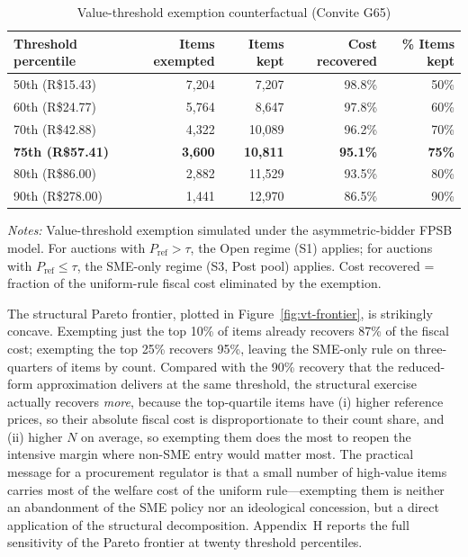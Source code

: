 \documentclass[12pt]{article}
\begin{document}
\begin{table}[htbp]
\centering
\caption{Value-threshold exemption counterfactual (Convite G65)}
\label{tab:cf}
\begin{threeparttable}
\small
\begin{tabular}{lrrrr}
\toprule
Threshold percentile & Items exempted & Items kept & Cost recovered &
\% Items kept \\
\midrule
50th (R\$15.43)  &  7{,}204 &  7{,}207 & 98.8\% & 50\% \\
60th (R\$24.77)  &  5{,}764 &  8{,}647 & 97.8\% & 60\% \\
70th (R\$42.88)  &  4{,}322 & 10{,}089 & 96.2\% & 70\% \\
\textbf{75th (R\$57.41)} & \textbf{3{,}600} & \textbf{10{,}811} &
\textbf{95.1\%} & \textbf{75\%} \\
80th (R\$86.00)  &  2{,}882 & 11{,}529 & 93.5\% & 80\% \\
90th (R\$278.00) &  1{,}441 & 12{,}970 & 86.5\% & 90\% \\
\bottomrule
\end{tabular}
\begin{tablenotes}
\footnotesize
\item \textit{Notes:} Value-threshold exemption simulated under the
asymmetric-bidder FPSB model. For auctions with $P_{\text{ref}} > \tau$,
the Open regime (S1) applies; for auctions with $P_{\text{ref}} \le \tau$,
the SME-only regime (S3, Post pool) applies. Cost recovered = fraction
of the uniform-rule fiscal cost eliminated by the exemption.
\end{tablenotes}
\end{threeparttable}
\end{table}

The structural Pareto frontier, plotted in
Figure~\ref{fig:vt-frontier}, is strikingly concave. Exempting
just the top 10\% of items already recovers 87\% of the fiscal
cost; exempting the top 25\% recovers 95\%, leaving the SME-only
rule on three-quarters of items by count. Compared with the 90\%
recovery that the reduced-form approximation delivers at the
same threshold, the structural exercise actually recovers
\emph{more}, because the top-quartile items have (i) higher
reference prices, so their absolute fiscal cost is disproportionate
to their count share, and (ii) higher $N$ on average, so exempting
them does the most to reopen the intensive margin where non-SME
entry would matter most. The practical message for a procurement
regulator is that a small number of high-value items carries most
of the welfare cost of the uniform rule---exempting them is
neither an abandonment of the SME policy nor an ideological
concession, but a direct application of the structural decomposition.
Appendix~H reports the full sensitivity of the Pareto frontier
at twenty threshold percentiles.
\end{document}
